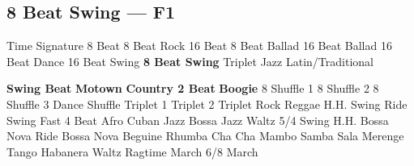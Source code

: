 \subsection{8 Beat Swing --- F1}
Time Signature
8 Beat
8 Beat Rock
16 Beat
8 Beat Ballad
16 Beat Ballad
16 Beat Dance
16 Beat Swing
\textbf{8 Beat Swing}
Triplet
Jazz
Latin/Traditional





























\textbf{Swing Beat}
\textbf{Motown}
\textbf{Country 2 Beat}
\textbf{Boogie}
8 Shuffle 1
8 Shuffle 2
8 Shuffle 3
Dance Shuffle
Triplet 1
Triplet 2
Triplet Rock
Reggae
H.H. Swing
Ride Swing
Fast 4 Beat
Afro Cuban
Jazz Bossa
Jazz Waltz
5/4 Swing
H.H. Bossa Nova
Ride Bossa Nova
Beguine
Rhumba
Cha Cha
Mambo
Samba
Sala
Merenge
Tango
Habanera
Waltz
Ragtime
March
6/8 March
